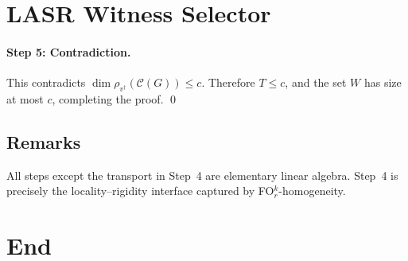 \documentclass{article}
\begin{document}
\section{LASR Witness Selector}

\paragraph{Step 5: Contradiction.}
This contradicts $\dim \rho_{v^\dagger}(\mathcal C(G))\le c$.
Therefore $T\le c$, and the set $W$ has size at most $c$, completing the proof.
\qed

\subsection*{Remarks}
All steps except the transport in Step~4 are elementary linear algebra.
Step~4 is precisely the locality--rigidity interface captured by FO$^k_r$-homogeneity.

\section*{End}
\end{document}
